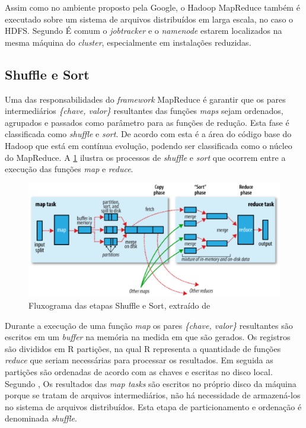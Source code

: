 Assim como no ambiente proposto pela Google, o Hadoop MapReduce também é executado sobre um sistema de arquivos distribuídos em larga escala, no caso o HDFS. Segundo  É comum o \textit{jobtracker} e o \textit{namenode} estarem localizados na mesma máquina do \textit{cluster}, especialmente em instalações reduzidas.

\subsection{Shuffle e Sort}

Uma das responsabilidades do \textit{framework} MapReduce é garantir que os pares intermediários \textit{\{chave, valor\}} resultantes das funções \textit{maps} sejam ordenados, agrupados e passados como parâmetro para as funções de redução. Esta fase é classificada como \textit{shuffle} e \textit{sort}. De acordo com  esta é a área do código base do Hadoop que está em contínua evolução, podendo ser classificada como o núcleo do MapReduce. A \ref{fig-shuffle} ilustra os processos de \textit{shuffle} e \textit{sort} que ocorrem entre a execução das funções \textit{map} e \textit{reduce}.

\begin{figure}[ht!]
	\centering
	\includegraphics[keepaspectratio=true,scale=0.6]
	  {figuras/shuffle.eps}
	\caption{Fluxograma das etapas Shuffle e Sort, extraído de \cite{white2012}}
	\label{fig-shuffle}
\end{figure}

Durante a execução de uma função \textit{map} os pares \textit{\{chave, valor\}} resultantes são escritos em um \textit{buffer} na memória na medida em que são gerados. Os registros são divididos em R partições, na qual R representa a quantidade de funções \textit{reduce} que seriam necessárias para processar os resultados. Em seguida as partições são ordenadas de acordo com as chaves e escritas no disco local. Segundo , Os resultados das \textit{map tasks} são escritos no próprio disco da máquina porque se tratam de arquivos intermediários, não há necessidade de armazená-los no sistema de arquivos distribuídos. Esta etapa de particionamento e ordenação é denominada \textit{shuffle}.

